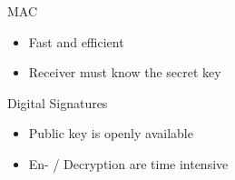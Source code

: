 
\begin{concept}{MAC}
    \begin{itemize}
        \item Fast and efficient
        \item Receiver must know the secret key
    \end{itemize}
\end{concept}

\begin{concept}{Digital Signatures}
    \begin{itemize}
        \item Public key is openly available
        \item En- / Decryption are time intensive
    \end{itemize}
\end{concept}

\multend